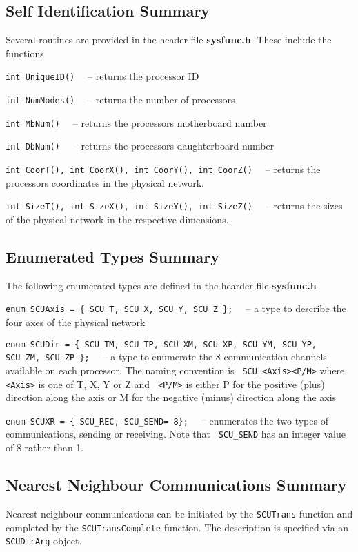 \subsection{Self Identification Summary}
Several routines are provided in the header file {\bf sysfunc.h}.
These include the functions 
\begin{description}
\item{\tt int UniqueID() \ } -- returns the processor ID
\item{\tt int NumNodes() \ } -- returns the number of processors
\item{\tt int MbNum()    \ } -- returns the processors motherboard number
\item{\tt int DbNum()    \ } -- returns the processors daughterboard number
\item{\tt int CoorT(), int CoorX(), int CoorY(), int CoorZ() \ } -- returns
the processors coordinates in the physical network.
\item{\tt int SizeT(), int SizeX(), int SizeY(), int SizeZ() \ } -- returns
the sizes of the physical network in the respective dimensions.
\end{description}

\subsection{Enumerated Types Summary}
The following enumerated types are defined in the hearder file {\bf sysfunc.h}
\begin{description}
\item{\footnotesize \tt enum SCUAxis = \{ SCU\_T, SCU\_X, SCU\_Y, SCU\_Z \}; \ } -- a type to describe the four axes of the physical network
\item{\footnotesize \tt enum SCUDir = \{ SCU\_TM, SCU\_TP, SCU\_XM, SCU\_XP, SCU\_YM, SCU\_YP, SCU\_ZM, SCU\_ZP \}; \ } -- a type to enumerate the 8 communication
channels available on each processor. The naming convention is {\tt
SCU\_<Axis><P/M>} where {\tt <Axis>} is one of T, X, Y or Z and {\tt
<P/M>} is either P for the positive (plus) direction along the axis or
M for the negative (minus) direction along the axis
\item{\footnotesize \tt enum SCUXR = \{ SCU\_REC, SCU\_SEND= 8\}; \ } -- enumerates
the two types of communications, sending or receiving. Note that {\tt
SCU\_SEND} has an integer value of 8 rather than 1.
\end{description}

\subsection{Nearest Neighbour Communications Summary}
Nearest neighbour communications can be initiated by the {\tt SCUTrans}
function and completed by the {\tt SCUTransComplete} function. The description
is specified via an {\tt SCUDirArg} object.

